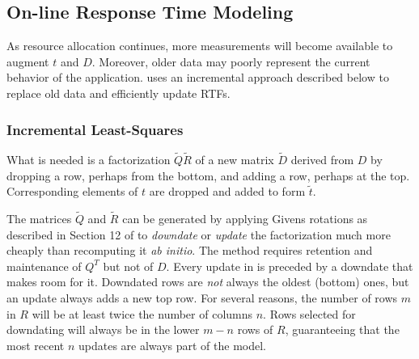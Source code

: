 
\subsection{On-line Response Time Modeling}
As resource allocation continues, more measurements will become available to augment $t$ and $D$.
Moreover, older data may poorly represent the current behavior of the application.
\pacora uses an incremental approach described below to replace old data and efficiently update RTFs.

\subsubsection*{Incremental Least-Squares}
What is needed is a factorization $\tilde{Q}\tilde{R}$ of a new matrix $\tilde{D}$
derived from $D$ by dropping a row, perhaps from the bottom,
and adding a row, perhaps at the top.
Corresponding elements of $t$ are dropped and added to form $\tilde{t}$.

The matrices $\tilde{Q}$ and $\tilde{R}$ can be generated by applying Givens rotations
as described in Section 12 of \cite{GoVL} to \emph{downdate} or \emph{update} the factorization
much more cheaply than recomputing it \emph{ab initio}.
The method requires retention and maintenance of $Q^T$ but not of $D$.
Every update in \pacora is preceded by a downdate that makes room for it.
Downdated rows are \emph{not} always the oldest (bottom) ones, but
an update always adds a new top row.
For several reasons, the number of rows $m$ in $R$
will be at least twice the number of columns $n$.
Rows selected for downdating will always be in the lower $m - n$ rows of $R$,
guaranteeing that the most recent $n$ updates are always part of the model.


